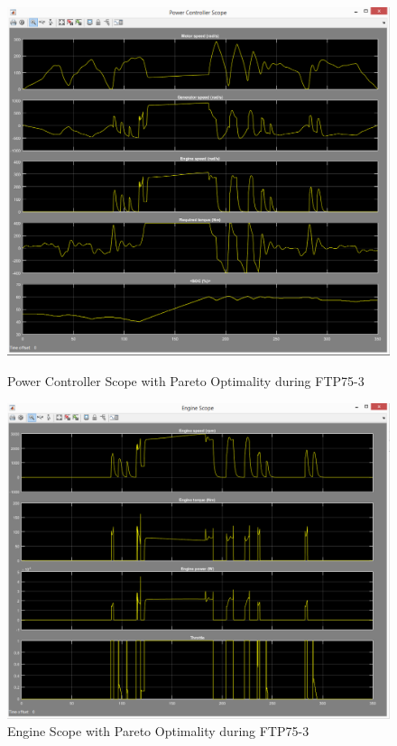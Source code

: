 \begin{figure}[hp]
\centering
\includegraphics[scale=0.4]{figures/Pareto/FTP75-3/powerController08Juni}
\caption{Power Controller Scope with Pareto Optimality during FTP75-3}
\label{fig:pcpo3}
\includegraphics[scale=0.42]{figures/Pareto/FTP75-3/engine08Juni}
\caption{Engine Scope with Pareto Optimality during FTP75-3}
\label{fig:epo3}
\end{figure}


